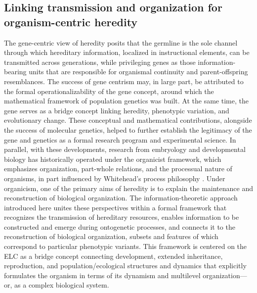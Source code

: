 \documentclass[pdflatex,sn-mathphys-num]{sn-jnl}
\theoremstyle{thmstylethree}
\theoremstyle{thmstyleone}
\begin{document}
\subsection{Linking transmission and organization for organism-centric heredity}
The gene-centric view of heredity posits that the germline is the sole channel through which hereditary information, localized in instructional elements, can be transmitted across generations, while privileging genes as those information-bearing units that are responsible for organismal continuity and parent-offspring resemblances. The success of gene centrism may, in large part, be attributed to the formal operationalizability of the gene concept, around which the mathematical framework of population genetics was built. At the same time, the gene serves as a bridge concept linking heredity, phenotypic variation, and evolutionary change. These conceptual and mathematical contributions, alongside the success of molecular genetics, helped to further establish the legitimacy of the gene and genetics as a formal research program and experimental science. In parallel, with these developments, research from embryology and developmental biology has historically operated under the organicist framework, which emphasizes organization, part-whole relations, and the processual nature of organisms, in part influenced by Whitehead’s process philosophy \cite{whitehead2010process}. Under organicism, one of the primary aims of heredity is to explain the maintenance and reconstruction of biological organization. The information-theoretic approach introduced here unites these perspectives within a formal framework that recognizes the transmission of hereditary resources, enables information to be constructed and emerge during ontogenetic processes, and connects it to the reconstruction of biological organization, subsets and features of which correspond to particular phenotypic variants. This framework is centered on the ELC as a bridge concept connecting development, extended inheritance, reproduction, and population/ecological structures and dynamics that explicitly formulates the organism in terms of its dynamism and multilevel organization—or, as a complex biological system. 
\end{document}
